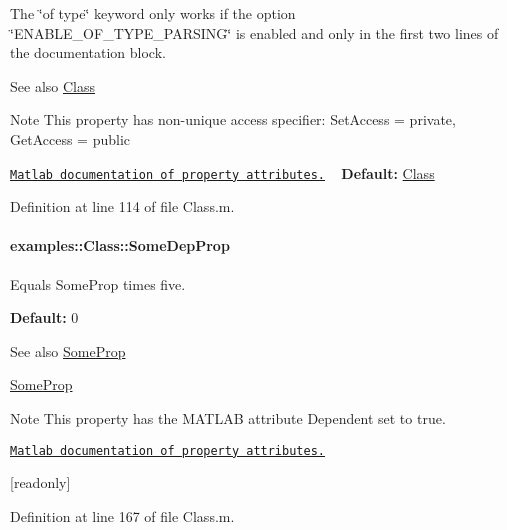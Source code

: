 The \char`\"{}of type\char`\"{} keyword only works if the option \char`\"{}\+E\+N\+A\+B\+L\+E\+\_\+\+O\+F\+\_\+\+T\+Y\+P\+E\+\_\+\+P\+A\+R\+S\+I\+N\+G\char`\"{} is enabled and only in the first two lines of the documentation block.

\begin{DoxySeeAlso}{See also}
\hyperlink{classexamples_1_1_class}{Class}
\end{DoxySeeAlso}
\begin{DoxyNote}{Note}
This property has non-\/unique access specifier\+: {\ttfamily Set\+Access = private, Get\+Access = public} 

\href{http://www.mathworks.de/help/techdoc/matlab_oop/brjjwby.html}{\tt Matlab documentation of property attributes.} ~\newline
{\bfseries Default\+:} \hyperlink{classexamples_1_1_class}{Class} 
\end{DoxyNote}


Definition at line 114 of file Class.\+m.

\hypertarget{classexamples_1_1_class_a4796b44c2e36e5691e955d947ed7dda2}{}
\paragraph[{Some\+Dep\+Prop}]{\setlength{\rightskip}{0pt plus 5cm}examples\+::\+Class\+::\+Some\+Dep\+Prop}\label{classexamples_1_1_class_a4796b44c2e36e5691e955d947ed7dda2}
Equals Some\+Prop times five.

{\bfseries Default\+:} 0

\begin{DoxySeeAlso}{See also}
\hyperlink{classexamples_1_1_class_ae3f0807afb99d8b3bc482712607653c7}{Some\+Prop} 

\hyperlink{classexamples_1_1_class_ae3f0807afb99d8b3bc482712607653c7}{Some\+Prop}
\end{DoxySeeAlso}
\begin{DoxyNote}{Note}
This property has the M\+A\+T\+L\+A\+B attribute {\ttfamily Dependent} set to true. 

\href{http://www.mathworks.de/help/techdoc/matlab_oop/brjjwby.html}{\tt Matlab documentation of property attributes.}

\mbox{[}readonly\mbox{]} 
\end{DoxyNote}


Definition at line 167 of file Class.\+m.

